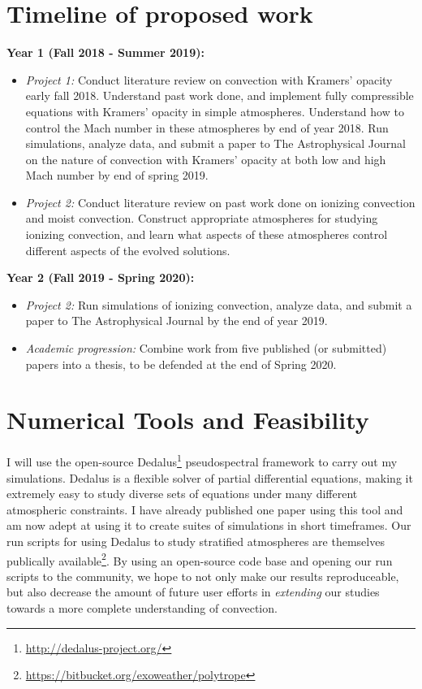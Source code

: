 \documentclass[aasms,12pt]{article}
\begin{document}
\section{Timeline of proposed work}
\textbf{Year 1 (Fall 2018 - Summer 2019):}
\begin{itemize}
\vspace{-0.2cm}
\item \emph{Project 1:} Conduct literature review on convection with Kramers' opacity early fall 2018.  
Understand past work done, and implement fully compressible equations with Kramers'
opacity in simple atmospheres.  Understand how to control the Mach number in these
atmospheres by end of year 2018.  Run simulations, analyze data, and submit a paper to The Astrophysical Journal
on the nature of convection with Kramers' opacity at both low and high Mach number by
end of spring 2019.
\vspace{-0.2cm}
\item \emph{Project 2:} Conduct literature review on past work done on ionizing convection and moist convection.
Construct appropriate atmospheres for studying ionizing convection, and learn what aspects of
these atmospheres control different aspects of the evolved solutions.
\end{itemize}

\textbf{Year 2 (Fall 2019 - Spring 2020):}
\begin{itemize}
\vspace{-0.2cm}
\item  \emph{Project 2:} Run simulations of ionizing convection, analyze data, and submit a paper to The
Astrophysical Journal by the end of year 2019.
\vspace{-0.2cm}
\item \emph{Academic progression:} Combine work from five published (or submitted) papers into a thesis, to be defended at the end of 
Spring 2020.
\end{itemize}

\section{Numerical Tools and Feasibility}
I will use the open-source Dedalus\footnote{\url{http://dedalus-project.org/}} pseudospectral framework 
\citep{burns&all2016} to carry out my simulations.  
Dedalus is a flexible solver of partial differential equations,
making it extremely easy to study diverse sets of equations under many different atmospheric
constraints.  I have already published one paper using this tool \citep{anders&brown2017}
and am now adept at using it to create suites of simulations
in short timeframes. Our run scripts for using Dedalus to study stratified atmospheres
are themselves publically available\footnote{\url{https://bitbucket.org/exoweather/polytrope}}.
By using an open-source code base and opening our run scripts to the community, we hope to
not only make our results reproduceable, but also decrease the amount of future user efforts in 
\emph{extending} our studies towards a more complete understanding of convection.
\end{document}
